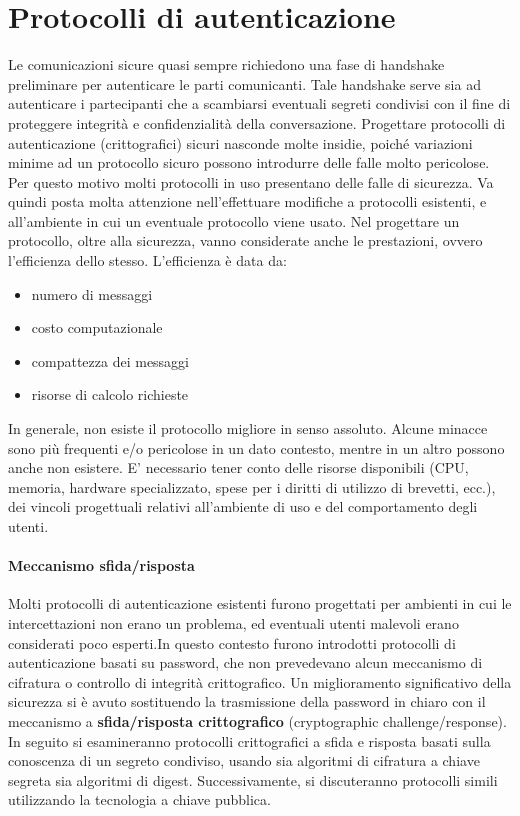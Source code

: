 \section{Protocolli di autenticazione}
Le comunicazioni sicure quasi sempre richiedono una fase di handshake preliminare per autenticare le parti comunicanti. Tale handshake serve sia ad autenticare i partecipanti che a scambiarsi eventuali segreti condivisi con il fine di proteggere integrità e confidenzialità della conversazione. Progettare protocolli di autenticazione (crittografici) sicuri nasconde molte insidie, poiché variazioni minime ad un protocollo sicuro possono introdurre delle falle molto pericolose. Per questo motivo molti protocolli in uso presentano delle falle di sicurezza. Va quindi posta molta attenzione nell'effettuare modifiche a protocolli esistenti, e all'ambiente in cui un eventuale protocollo viene usato.
\newline \newline 
Nel progettare un protocollo, oltre alla sicurezza, vanno considerate anche le prestazioni, ovvero l’efficienza dello stesso. L’efficienza è data da:
\begin{itemize}
\item numero di messaggi
\item costo computazionale
\item compattezza dei messaggi
\item risorse di calcolo richieste
\end{itemize}
In generale, non esiste il protocollo migliore in senso assoluto. Alcune minacce sono più frequenti e/o pericolose in un dato contesto, mentre in un altro possono anche non esistere. E' necessario tener conto delle risorse disponibili (CPU, memoria, hardware specializzato, spese per i diritti di utilizzo di brevetti, ecc.), dei vincoli progettuali relativi all’ambiente di uso e del comportamento degli utenti.
\paragraph{Meccanismo sfida/risposta}
Molti protocolli di autenticazione esistenti furono progettati per ambienti in cui le intercettazioni non erano un problema, ed eventuali utenti malevoli erano considerati poco esperti.In questo contesto furono introdotti protocolli di autenticazione basati su password, che non prevedevano alcun meccanismo di cifratura o controllo di integrità crittografico.
\newline \newline
Un miglioramento significativo della sicurezza si è avuto sostituendo la trasmissione della password in chiaro con il meccanismo a \textbf{sfida/risposta crittografico} (cryptographic challenge/response). In seguito si esamineranno protocolli crittografici a sfida e risposta basati sulla conoscenza di un segreto condiviso, usando sia algoritmi di cifratura a chiave segreta sia algoritmi di digest. Successivamente, si discuteranno protocolli simili utilizzando la tecnologia a chiave pubblica.


